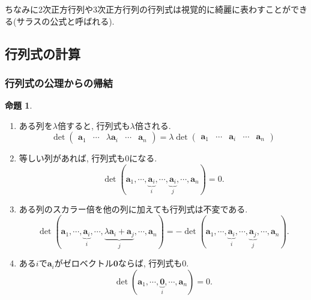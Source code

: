 \documentclass[dvipdfmx,a4paper,11pt]{article}
\theoremstyle{definition}
\newtheorem{prop}[thm]{命題}
\begin{document}
ちなみに2次正方行列や3次正方行列の行列式は視覚的に綺麗に表わすことができる(サラスの公式と呼ばれる).

\subsection{行列式の計算 \cite[3.2節]{M}}

\subsubsection{行列式の公理からの帰結}
\begin{tcolorbox}[
    colback = white,
    colframe = green!35!black,
    fonttitle = \bfseries,
    breakable = true]
    \begin{prop}\cite[系3.2]{M}
     \begin{enumerate}
    \setlength{\parskip}{0cm} 
  \setlength{\itemsep}{0cm}
 \item  ある列を$\lambda$倍すると, 行列式も$\lambda$倍される.
 $$
 \det \begin{pmatrix}
    \bm{a}_1&\cdots&\lambda\bm{a}_i&\cdots&\bm{a}_n
    \end{pmatrix}
    =
    \lambda
     \det \begin{pmatrix}
    \bm{a}_1&\cdots&\bm{a}_i&\cdots&\bm{a}_n
    \end{pmatrix}
 $$
 \item 等しい列があれば, 行列式も0になる. 
 $$
 \det(\bm{a}_1, \cdots, \underbrace{\bm{a}_i}_{i}, \cdots , \underbrace{\bm{a}_i}_{j}, \cdots, \bm{a}_n)
=0.
 $$
 \item ある列のスカラー倍を他の列に加えても行列式は不変である. 
 $$
\det(
    \bm{a}_1, \cdots, \underbrace{\bm{a}_i}_{i}, \cdots , \underbrace{\lambda\bm{a}_i + \bm{a}_j}_{j}, \cdots, \bm{a}_n
)
=
-\det(
    \bm{a}_1, \cdots, \underbrace{\bm{a}_i}_{i}, \cdots , \underbrace{\bm{a}_j}_{j}, \cdots, \bm{a}_n
).
 $$
 \item ある$i$で$\bm{a}_i$がゼロベクトル$\bm{0}$ならば, 行列式も0.
 $$ \det(
    \bm{a}_1, \cdots, \underbrace{\bm{0}}_{i}, \cdots, \bm{a}_n
)=0.$$
 \end{enumerate}
  \end{prop}
 \end{tcolorbox}
  
\end{document}
